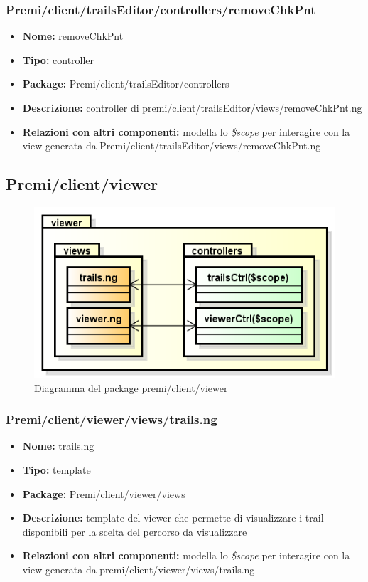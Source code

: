 \subsubsection{Premi/client/trailsEditor/controllers/removeChkPnt}
\begin{itemize}
  \item[] \textbf{Nome:} removeChkPnt
  \item[] \textbf{Tipo:} controller
  \item[] \textbf{Package:} Premi/client/trailsEditor/controllers
  \item[] \textbf{Descrizione:} controller di premi/client/trailsEditor/views/removeChkPnt.ng
  \item[] \textbf{Relazioni con altri componenti:} modella lo \textit{\$scope} per interagire con la view generata da Premi/client/trailsEditor/views/removeChkPnt.ng
\end{itemize}

\subsection{Premi/client/viewer}
\begin{figure}[!h]
\begin{center}
\includegraphics[scale=0.45]{img/diapkg/viewer.png}
\caption{Diagramma del package premi/client/viewer}
\end{center}
\end{figure}
\subsubsection{Premi/client/viewer/views/trails.ng}
\begin{itemize}
  \item[] \textbf{Nome:} trails.ng
  \item[] \textbf{Tipo:} template
  \item[] \textbf{Package:} Premi/client/viewer/views
  \item[] \textbf{Descrizione:} template del viewer che permette di visualizzare i trail disponibili per la scelta del percorso da visualizzare
  \item[] \textbf{Relazioni con altri componenti:} modella lo \textit{\$scope} per interagire con la view generata da premi/client/viewer/views/trails.ng
\end{itemize}
